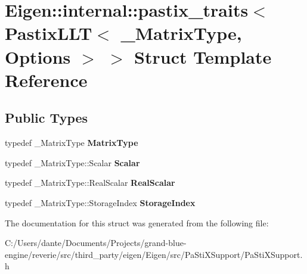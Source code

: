 \hypertarget{struct_eigen_1_1internal_1_1pastix__traits_3_01_pastix_l_l_t_3_01___matrix_type_00_01_options_01_4_01_4}{}\section{Eigen\+::internal\+::pastix\+\_\+traits$<$ Pastix\+L\+LT$<$ \+\_\+\+Matrix\+Type, Options $>$ $>$ Struct Template Reference}
\label{struct_eigen_1_1internal_1_1pastix__traits_3_01_pastix_l_l_t_3_01___matrix_type_00_01_options_01_4_01_4}
\subsection*{Public Types}
\begin{DoxyCompactItemize}
\item 
\mbox{\label{struct_eigen_1_1internal_1_1pastix__traits_3_01_pastix_l_l_t_3_01___matrix_type_00_01_options_01_4_01_4_a61766da52cf38a40a9d8afeebb72889f}} 
typedef \+\_\+\+Matrix\+Type {\bfseries Matrix\+Type}
\item 
\mbox{\label{struct_eigen_1_1internal_1_1pastix__traits_3_01_pastix_l_l_t_3_01___matrix_type_00_01_options_01_4_01_4_ac6506f6e99e6231cba90a17ce721faaf}} 
typedef \+\_\+\+Matrix\+Type\+::\+Scalar {\bfseries Scalar}
\item 
\mbox{\label{struct_eigen_1_1internal_1_1pastix__traits_3_01_pastix_l_l_t_3_01___matrix_type_00_01_options_01_4_01_4_a15a2ad1b048090501c159dfe49af97ec}} 
typedef \+\_\+\+Matrix\+Type\+::\+Real\+Scalar {\bfseries Real\+Scalar}
\item 
\mbox{\label{struct_eigen_1_1internal_1_1pastix__traits_3_01_pastix_l_l_t_3_01___matrix_type_00_01_options_01_4_01_4_a043abc9c458ee20bdf7df674eab32200}} 
typedef \+\_\+\+Matrix\+Type\+::\+Storage\+Index {\bfseries Storage\+Index}
\end{DoxyCompactItemize}


The documentation for this struct was generated from the following file\+:\begin{DoxyCompactItemize}
\item 
C\+:/\+Users/dante/\+Documents/\+Projects/grand-\/blue-\/engine/reverie/src/third\+\_\+party/eigen/\+Eigen/src/\+Pa\+Sti\+X\+Support/Pa\+Sti\+X\+Support.\+h\end{DoxyCompactItemize}
